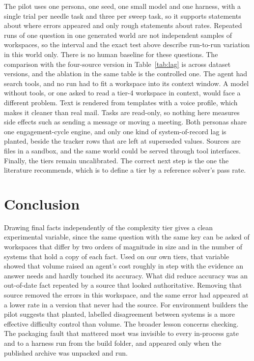 \documentclass{article}
\begin{document}
The pilot uses one persona, one seed, one small model and one harness, with a single trial per needle task and three per sweep task, so it supports statements about where errors appeared and only rough statements about rates. Repeated runs of one question in one generated world are not independent samples of workspaces, so the interval and the exact test above describe run-to-run variation in this world only. There is no human baseline for these questions. The comparison with the four-source version in Table~\ref{tab:lag} is across dataset versions, and the ablation in the same table is the controlled one. The agent had search tools, and no run had to fit a workspace into its context window. A model without tools, or one asked to read a tier-4 workspace in context, would face a different problem. Text is rendered from templates with a voice profile, which makes it cleaner than real mail. Tasks are read-only, so nothing here measures side effects such as sending a message or moving a meeting. Both personas share one engagement-cycle engine, and only one kind of system-of-record lag is planted, beside the tracker rows that are left at superseded values. Sources are files in a sandbox, and the same world could be served through tool interfaces. Finally, the tiers remain uncalibrated. The correct next step is the one the literature recommends, which is to define a tier by a reference solver's pass rate.

\section{Conclusion}

Drawing final facts independently of the complexity tier gives a clean experimental variable, since the same question with the same key can be asked of workspaces that differ by two orders of magnitude in size and in the number of systems that hold a copy of each fact. Used on our own tiers, that variable showed that volume raised an agent's cost roughly in step with the evidence an answer needs and hardly touched its accuracy. What did reduce accuracy was an out-of-date fact repeated by a source that looked authoritative. Removing that source removed the errors in this workspace, and the same error had appeared at a lower rate in a version that never had the source. For environment builders the pilot suggests that planted, labelled disagreement between systems is a more effective difficulty control than volume. The broader lesson concerns checking. The packaging fault that mattered most was invisible to every in-process gate and to a harness run from the build folder, and appeared only when the published archive was unpacked and run.
\end{document}
